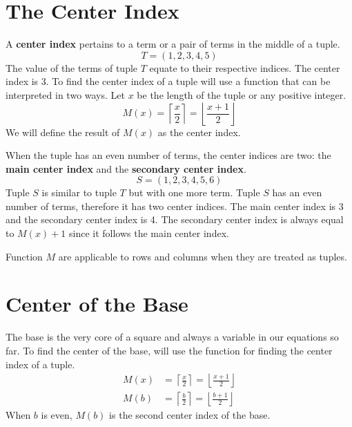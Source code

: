 \documentclass[letterpaper, twoside,12pt]{book}
\begin{document}
    \section{The Center Index} \label{center_index}
    A \textbf{center index} pertains to a term or a pair of terms in the middle of a tuple.
    \begin{equation*}
        T = (1,2,3,4,5)
    \end{equation*}
    The value of the terms of tuple $T$ equate to their respective indices. The center index is 3. To find the center index of a tuple will use a function that can be interpreted in two ways. Let $x$ be the length of the tuple or any positive integer.
    \begin{equation}
        M(x) = \left\lceil \frac{x}{2} \right\rceil = \left\lfloor \frac{x+1}{2} \right\rfloor
    \end{equation}
    We will define the result of $M(x)$ as the center index. 

    When the tuple has an even number of terms, the center indices are two: the \textbf{main center index} and the \textbf{secondary center index}.
    \begin{equation*}
        S = (1,2,3,4,5,6)
    \end{equation*}
    Tuple $S$ is similar to tuple $T$ but with one more term. Tuple $S$ has an even number of terms, therefore it has two center indices. The main center index is 3 and the secondary center index is 4. The secondary center index is always equal to $M(x) + 1$ since it follows the main center index.

    Function $M$ are applicable to rows and columns when they are treated as tuples.

    \section{Center of the Base} \label{center_base}
    The base is the very core of a square and always a variable in our equations so far. To find the center of the base, will use the function for finding the center index of a tuple.
    \begin{equation}
        \begin{split}
            M(x) &= \left\lceil \frac{x}{2} \right\rceil = \left\lfloor \frac{x+1}{2} \right\rfloor \\
            M(b) &= \left\lceil \frac{b}{2} \right\rceil = \left\lfloor \frac{b+1}{2} \right\rfloor
        \end{split}
    \end{equation}
    When $b$ is even, $M(b)$ is the second center index of the base.
\end{document}
